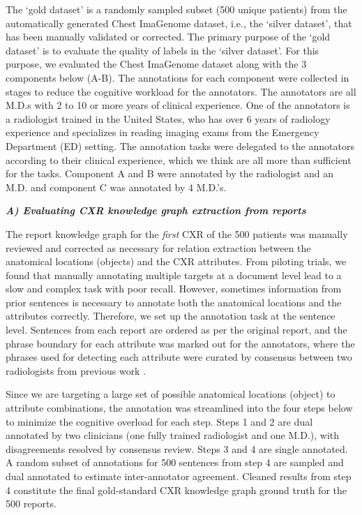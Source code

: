 The `gold dataset' is a randomly sampled subset (500 unique patients) from the automatically generated Chest ImaGenome dataset, i.e., the `silver dataset', that has been manually validated or corrected. The primary purpose of the `gold dataset' is to evaluate the quality of labels in the `silver dataset'. For this purpose, we evaluated the Chest ImaGenome dataset along with the 3 components below (A-B). The annotations for each component were collected in stages to reduce the cognitive workload for the annotators. The annotators are all M.D.s with 2 to 10 or more years of clinical experience. One of the annotators is a radiologist trained in the United States, who has over 6 years of radiology experience and specializes in reading imaging exams from the Emergency Department (ED) setting. The annotation tasks were delegated to the annotators according to their clinical experience, which we think are all more than sufficient for the tasks. Component A and B were annotated by the radiologist and an M.D. and component C was annotated by 4 M.D.'s.


\vspace{+10pt}
\textbf{\textit{A) Evaluating CXR knowledge graph extraction from reports}}
\vspace{+5pt}

The report knowledge graph for the \textit{first} CXR of the 500 patients was manually reviewed and corrected as necessary for relation extraction between the anatomical locations (objects) and the CXR attributes. From piloting trials, we found that manually annotating multiple targets at a document level lead to a slow and complex task with poor recall. However, sometimes information from prior sentences is necessary to annotate both the anatomical locations and the attributes correctly. Therefore, we set up the annotation task at the sentence level. Sentences from each report are ordered as per the original report, and the phrase boundary for each attribute was marked out for the annotators, where the phrases used for detecting each attribute were curated by consensus between two radiologists from previous work \cite{wu2020ai}. 

Since we are targeting a large set of possible anatomical locations (object) to attribute combinations, the annotation was streamlined into the four steps below to minimize the cognitive overload for each step. Steps 1 and 2 are dual annotated by two clinicians (one fully trained radiologist and one M.D.), with disagreements resolved by consensus review. Steps 3 and 4 are single annotated. A random subset of annotations for 500 sentences from step 4 are sampled and dual annotated to estimate inter-annotator agreement. Cleaned results from step 4 constitute the final gold-standard CXR knowledge graph ground truth for the 500 reports. 

